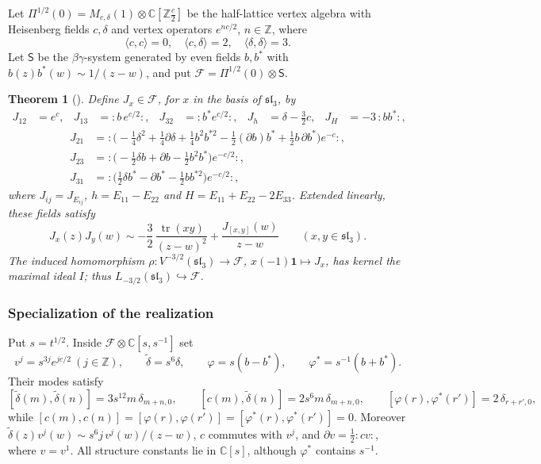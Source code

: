 \documentclass[11pt]{amsart}
\newtheorem{theorem}{Theorem}[section]
\theoremstyle{definition}
\theoremstyle{remark}
\newcommand{\Z}{\mathbb Z}
\begin{document}
{{
Let $\Pi^{1/2}(0)=M_{c,\delta}(1)\otimes \mathbb{C}[\mathbb{Z}\frac{c}{2}]$ be the half-lattice vertex algebra with Heisenberg fields $c,\delta$ and vertex operators $e^{nc/2}$, $n\in \Z$, where 
\[\langle c,c\rangle=0,\quad \langle c,\delta\rangle=2,\quad \langle \delta,\delta\rangle=3.\]
Let $\mathsf S$ be the $\beta\gamma$-system generated by even fields $b,b^*$ with $b(z)b^*(w)\sim1/(z-w)$, and put $\mathcal{F}=\Pi^{1/2}(0)\otimes \mathsf S$. 		
\begin{theorem}[\cite{Ad16,BMR,ACG}]
Define $J_x\in\mathcal{F}$, for $x$ in the basis of $\mathfrak{sl}_3$, by
\begin{align*}
	J_{12}&=e^{c}, & J_{13}&={:}b\,e^{c/2}{:}, & J_{32}&={:}b^*e^{c/2}{:}, &
	J_h&=\delta-\tfrac32c, & J_H&=-3\,{:}bb^*{:},
\end{align*}
\vspace{-3ex}
\begin{align*}
	J_{21}&={:}\bigl(-\tfrac14\delta^2+\tfrac14\partial\delta+\tfrac14b^2b^{*2}
	-\tfrac12(\partial b)b^*+\tfrac12b\,\partial b^*\bigr)e^{-c}{:},\\
	J_{23}&={:}\bigl(-\tfrac12\delta b+\partial b-\tfrac12b^2b^*\bigr)e^{-c/2}{:},\\
	J_{31}&={:}\bigl(\tfrac12\delta b^*-\partial b^*-\tfrac12bb^{*2}\bigr)e^{-c/2}{:},
\end{align*}
where $J_{ij}=J_{E_{ij}}$, $h=E_{11}-E_{22}$ and $H=E_{11}+E_{22}-2E_{33}$. Extended linearly,
these fields satisfy
\[
J_x(z)J_y(w)\sim-\frac32\,\frac{\operatorname{tr}(xy)}{(z-w)^2}+\frac{J_{[x,y]}(w)}{z-w}
\qquad(x,y\in\mathfrak{sl}_3).
\]
The induced homomorphism $\rho\colon V^{-3/2}(\mathfrak{sl}_3)\to\mathcal{F}$,
$x(-1)\mathbf 1\mapsto J_x$, has kernel the maximal ideal $I$; thus
$L_{-3/2}(\mathfrak{sl}_3)\hookrightarrow\mathcal{F}$.
\end{theorem}


\subsubsection{Specialization of the realization}
 Put $s=t^{1/2}$. \color{black} Inside $\mathcal{F}\otimes\mathbb{C}[s,s^{-1}]$ set
\[
v^{j}=s^{3j}e^{jc/2}\ (j\in\mathbb{Z}),\qquad \tilde\delta=s^6\delta,\qquad
\varphi=s(b-b^*),\qquad \varphi^*=s^{-1}(b+b^*).
\]
Their modes satisfy
\[
[\tilde\delta(m),\tilde\delta(n)]=3s^{12}m\,\delta_{m+n,0},\qquad
[c(m),\tilde\delta(n)]=2s^{6}m\,\delta_{m+n,0},\qquad
[\varphi(r),\varphi^*(r')]=2\,\delta_{r+r',0},
\]
while $[c(m),c(n)]=[\varphi(r),\varphi(r')]=[\varphi^*(r),\varphi^*(r')]=0$. Moreover
$\tilde\delta(z)v^{j}(w)\sim s^6j\,v^j(w)/(z-w)$, $c$ commutes with $v^j$, and
$\partial v=\tfrac12{:}cv{:}$, where $v=v^1$. All structure constants lie in $\mathbb{C}[s]$,
although $\varphi^*$ contains $s^{-1}$.

}}
\end{document}
